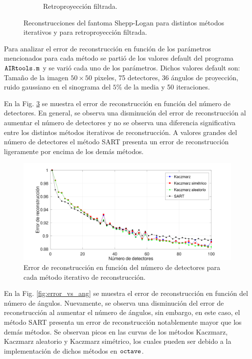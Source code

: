 \documentclass[letterpaper,12pt]{article}
\theoremstyle{plain}
\begin{document}
\begin{figure}[H]
\begin{subfigure}[h]{0.32\linewidth}
            \caption{Retroproyección filtrada.}
            \label{fig:noise_hahn}
      \end{subfigure}
   \caption{Reconstrucciones del fantoma Shepp-Logan para distintos métodos iterativos y para retroproyección filtrada.}
   \label{fig:reconstrucciones}
\end{figure}

Para analizar el error de reconstrucción en función de los parámetros mencionados para cada método se partió de los valores default del programa $\verb|AIRtools.m|$ y se varió cada uno de los parámetros. Dichos valores default son: Tamaño de la imagen $50\times50$ pixeles, 75 detectores, 36 ángulos de proyección, ruido gaussiano en el sinograma del $5\%$ de la media y 50 iteraciones. 

En la Fig. \ref{fig:error_vs_det} se muestra el error de reconstrucción en función del número de detectores. En general, se observa una disminución del error de reconstrucción al aumentar el número de detectores y no se observa una diferencia significativa entre los distintos métodos iterativos de reconstrucción. A valores grandes del número de detectores el método SART presenta un error de reconstrucción ligeramente por encima de los demás métodos.

\begin{figure}[H]
   \centering
         \includegraphics[width=\textwidth]{Figuras/err_vs_det.png}
   \caption{Error de reconstrucción en función del número de detectores para cada método iterativo de reconstrucción.}
   \label{fig:error_vs_det}
\end{figure}

En la Fig. \ref{fig:error_vs_ang} se muestra el error de reconstrucción en función del número de ángulos. Nuevamente, se observa una disminución del error de reconstrucción al aumentar el número de ángulos, sin embargo, en este caso, el método SART presenta un error de reconstrucción notablemente mayor que los demás métodos. Se observan picos en las curvas de los métodos Kaczmarz, Kaczmarz aleatorio y Kaczmarz simétrico, los cuales pueden ser debido a la implementación de dichos métodos en $\verb|octave|$.  
\end{document}
